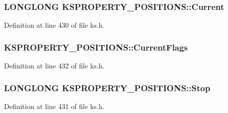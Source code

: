 \subsubsection[{\texorpdfstring{Current}{Current}}]{\setlength{\rightskip}{0pt plus 5cm}L\+O\+N\+G\+L\+O\+NG K\+S\+P\+R\+O\+P\+E\+R\+T\+Y\+\_\+\+P\+O\+S\+I\+T\+I\+O\+N\+S\+::\+Current}\hypertarget{struct_k_s_p_r_o_p_e_r_t_y___p_o_s_i_t_i_o_n_s_a27c7bb9aa752f141cfc7c39f494b36bb}{}\label{struct_k_s_p_r_o_p_e_r_t_y___p_o_s_i_t_i_o_n_s_a27c7bb9aa752f141cfc7c39f494b36bb}


Definition at line 430 of file ks.\+h.

\subsubsection[{\texorpdfstring{Current\+Flags}{CurrentFlags}}]{ K\+S\+P\+R\+O\+P\+E\+R\+T\+Y\+\_\+\+P\+O\+S\+I\+T\+I\+O\+N\+S\+::\+Current\+Flags}\hypertarget{struct_k_s_p_r_o_p_e_r_t_y___p_o_s_i_t_i_o_n_s_afbad5c10f545d827da9597ed22ad8c2d}{}\label{struct_k_s_p_r_o_p_e_r_t_y___p_o_s_i_t_i_o_n_s_afbad5c10f545d827da9597ed22ad8c2d}


Definition at line 432 of file ks.\+h.

\subsubsection[{\texorpdfstring{Stop}{Stop}}]{\setlength{\rightskip}{0pt plus 5cm}L\+O\+N\+G\+L\+O\+NG K\+S\+P\+R\+O\+P\+E\+R\+T\+Y\+\_\+\+P\+O\+S\+I\+T\+I\+O\+N\+S\+::\+Stop}\hypertarget{struct_k_s_p_r_o_p_e_r_t_y___p_o_s_i_t_i_o_n_s_a80c5e691f55fd4926af7b2924f2e8b0e}{}\label{struct_k_s_p_r_o_p_e_r_t_y___p_o_s_i_t_i_o_n_s_a80c5e691f55fd4926af7b2924f2e8b0e}


Definition at line 431 of file ks.\+h.

